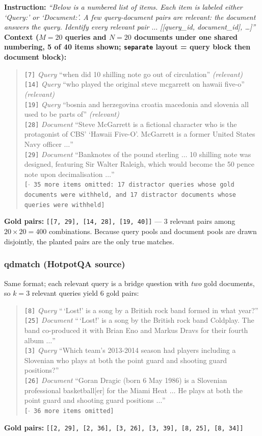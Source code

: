 \textbf{Instruction:} \emph{``Below is a numbered list of items. Each item is labeled either `Query:'
or `Document:'. A few query-document pairs are relevant: the document answers the query. Identify
every relevant pair $\dots$ [[query\_id, document\_id], \dots]''}\\
\textbf{Context ($M{=}20$ queries and $N{=}20$ documents under one shared numbering, 5 of 40 items
shown; \texttt{separate} layout = query block then document block):}
\begin{quote}\small
\texttt{[7]} \emph{Query} ``when did 10 shilling note go out of circulation'' \emph{(relevant)}\\
\texttt{[14]} \emph{Query} ``who played the original steve mcgarrett on hawaii five-o''
\emph{(relevant)}\\
\texttt{[19]} \emph{Query} ``bosnia and herzegovina croatia macedonia and slovenia all used to be
parts of'' \emph{(relevant)}\\
\texttt{[28]} \emph{Document} ``Steve McGarrett is a fictional character who is the protagonist of
CBS' `Hawaii Five-O'. McGarrett is a former United States Navy officer $\dots$''\\
\texttt{[29]} \emph{Document} ``Banknotes of the pound sterling $\dots$ 10 shilling note was
designed, featuring Sir Walter Raleigh, which would become the 50 pence note upon decimalisation
$\dots$''\\
\texttt{[$\cdot$ 35 more items omitted: 17 distractor queries whose gold documents were withheld, and
17 distractor documents whose queries were withheld]}
\end{quote}
\textbf{Gold pairs:} \texttt{[[7, 29], [14, 28], [19, 40]]} --- 3 relevant pairs among
$20 \times 20 = 400$ combinations. Because query pools and document pools are drawn disjointly, the
planted pairs are the only true matches.

\subsubsection{qdmatch (HotpotQA source)}

Same format; each relevant query is a bridge question with \emph{two} gold documents, so $k{=}3$
relevant queries yield 6 gold pairs:
\begin{quote}\small
\texttt{[8]} \emph{Query} ``\,`Lost!' is a song by a British rock band formed in what year?''\\
\texttt{[25]} \emph{Document} ``\,`Lost!' is a song by the British rock band Coldplay. The band
co-produced it with Brian Eno and Markus Dravs for their fourth album $\dots$''\\
\texttt{[3]} \emph{Query} ``Which team's 2013-2014 season had players including a Slovenian who plays
at both the point guard and shooting guard positions?''\\
\texttt{[26]} \emph{Document} ``Goran Dragic (born 6 May 1986) is a Slovenian professional
basketball[er] for the Miami Heat $\dots$ He plays at both the point guard and shooting guard
positions $\dots$''\\
\texttt{[$\cdot$ 36 more items omitted]}
\end{quote}
\textbf{Gold pairs:} \texttt{[[2, 29], [2, 36], [3, 26], [3, 39], [8, 25], [8, 34]]}

